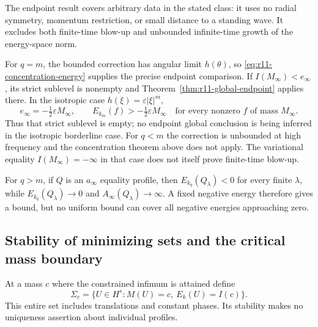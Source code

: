 The endpoint result covers arbitrary data in the stated class: it uses
no radial symmetry, momentum restriction, or small distance to a
standing wave.  It excludes both finite-time blow-up and unbounded
infinite-time growth of the energy-space norm.

For $q=m$, the bounded correction has angular limit $h(\theta)$, so
\eqref{eq:r11-concentration-energy} supplies the precise endpoint
comparison.  If $I(M_\infty)<e_\infty$, its strict sublevel is nonempty
and Theorem~\ref{thm:r11-global-endpoint} applies there.  In the
isotropic case $h(\xi)=\varepsilon|\xi|^m$,
\[
 e_\infty=-\tfrac12\varepsilon M_\infty,
 \qquad
 E_{k_m}(f)>-\tfrac12\varepsilon M_\infty
 \quad\text{for every nonzero }f\text{ of mass }M_\infty.
\]
Thus that strict sublevel is empty; no endpoint global conclusion is
being inferred in the isotropic borderline case.  For $q<m$ the
correction is unbounded at high frequency and the concentration theorem
above does not apply.  The variational equality
$I(M_\infty)=-\infty$ in that case does not itself prove finite-time
blow-up.

For $q>m$, if $Q$ is an $a_\infty$ equality profile, then
$E_{k_q}(Q_\lambda)<0$ for every finite $\lambda$, while
$E_{k_q}(Q_\lambda)\to0$ and $A_\infty(Q_\lambda)\to\infty$.
A fixed negative energy therefore gives a bound, but no uniform bound
can cover all negative energies approaching zero.

\subsection{Stability of minimizing sets and the critical mass boundary}

At a mass $c$ where the constrained infimum is attained define
\[
 \Sigma_c=\{U\in H^s:M(U)=c,\ E_k(U)=I(c)\}.
\]
This entire set includes translations and constant phases.  Its
stability makes no uniqueness assertion about individual profiles.

